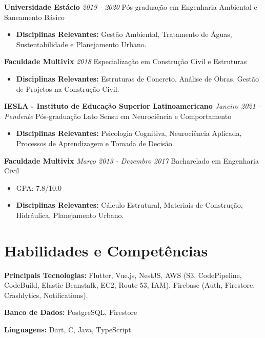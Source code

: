 \documentclass[10pt, letterpaper]{article}
\begin{document}
\textbf{Universidade Estácio} \hfill \textit{2019 - 2020}\newline
Pós-graduação em Engenharia Ambiental e Saneamento Básico
\begin{itemize}
    \item \textbf{Disciplinas Relevantes:} Gestão Ambiental, Tratamento de Águas, Sustentabilidade e Planejamento Urbano.
\end{itemize}

\textbf{Faculdade Multivix} \hfill \textit{2018}\newline
Especialização em Construção Civil e Estruturas
\begin{itemize}
    \item \textbf{Disciplinas Relevantes:} Estruturas de Concreto, Análise de Obras, Gestão de Projetos na Construção Civil.
\end{itemize}

\textbf{IESLA - Instituto de Educação Superior Latinoamericano} \hfill \textit{Janeiro 2021 - Pendente}\newline
Pós-graduação Lato Sensu em Neurociência e Comportamento
\begin{itemize}
    \item \textbf{Disciplinas Relevantes:} Psicologia Cognitiva, Neurociência Aplicada, Processos de Aprendizagem e Tomada de Decisão.
\end{itemize}

\textbf{Faculdade Multivix} \hfill \textit{Março 2013 - Dezembro 2017}\newline
Bacharelado em Engenharia Civil
\begin{itemize}
    \item GPA: 7.8/10.0
    \item \textbf{Disciplinas Relevantes:} Cálculo Estrutural, Materiais de Construção, Hidráulica, Planejamento Urbano.
\end{itemize}
        
\section{Habilidades e Competências}
\textbf{Principais Tecnologias:} Flutter, Vue.js, NestJS, AWS (S3, CodePipeline, CodeBuild, Elastic Beanstalk, EC2, Route 53, IAM), Firebase (Auth, Firestore, Crashlytics, Notifications).

\textbf{Banco de Dados:} PostgreSQL, Firestore

\textbf{Linguagens:} Dart, C, Java, TypeScript
\end{document}
